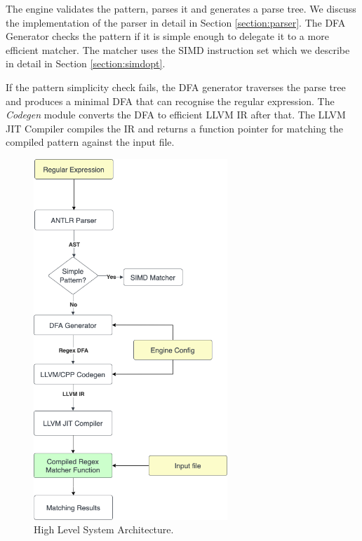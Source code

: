 The engine validates the pattern, parses it and generates a parse tree. We discuss the implementation of the parser in detail in Section \ref{section:parser}. The DFA Generator checks the pattern if it is simple enough to delegate it to a more efficient matcher. The matcher uses the SIMD instruction set which we describe in detail in Section \ref{section:simdopt}.

If the pattern simplicity check fails, the DFA generator traverses the parse tree and produces a minimal DFA that can recognise the regular expression. The \textit{Codegen} module converts the DFA to efficient LLVM IR after that. The LLVM JIT Compiler compiles the IR and returns a function pointer for matching the compiled pattern against the input file.

\begin{figure}[htpb]
\centering
\includegraphics[width=0.65\textwidth]{imgs/sa-ext2.png}
\caption[System Architecture]{High Level System Architecture.}\label{fig:sa}
\end{figure}



